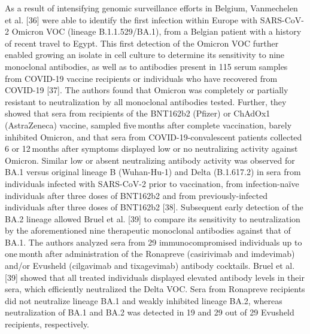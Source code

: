 As a result of intensifying genomic surveillance efforts in Belgium, Vanmechelen et al. [36] were able to identify the first infection within Europe with SARS-CoV-2 Omicron VOC (lineage B.1.1.529/BA.1), from a Belgian patient with a history of recent travel to Egypt. This first detection of the Omicron VOC further enabled growing an isolate in cell culture to determine its sensitivity to nine monoclonal antibodies, as well as to antibodies present in 115 serum samples from COVID-19 vaccine recipients or individuals who have recovered from COVID-19 [37]. The authors found that Omicron was completely or partially resistant to neutralization by all monoclonal antibodies tested. Further, they showed that sera from recipients of the BNT162b2 (Pfizer) or ChAdOx1 (AstraZeneca) vaccine, sampled five months after complete vaccination, barely inhibited Omicron, and that sera from COVID-19-convalescent patients collected 6 or 12 months after symptoms displayed low or no neutralizing activity against Omicron. Similar low or absent neutralizing antibody activity was observed for BA.1 versus original lineage B (Wuhan-Hu-1) and Delta (B.1.617.2) in sera from individuals infected with SARS-CoV-2 prior to vaccination, from infection-naïve individuals after three doses of BNT162b2 and from previously-infected individuals after three doses of BNT162b2 [38]. Subsequent early detection of the BA.2 lineage allowed Bruel et al. [39] to compare its sensitivity to neutralization by the aforementioned nine therapeutic monoclonal antibodies against that of BA.1. The authors analyzed sera from 29 immunocompromised individuals up to one month after administration of the Ronapreve (casirivimab and imdevimab) and/or Evusheld (cilgavimab and tixagevimab) antibody cocktails. Bruel et al. [39] showed that all treated individuals displayed elevated antibody levels in their sera, which efficiently neutralized the Delta VOC. Sera from Ronapreve recipients did not neutralize lineage BA.1 and weakly inhibited lineage BA.2, whereas neutralization of BA.1 and BA.2 was detected in 19 and 29 out of 29 Evusheld recipients, respectively.
